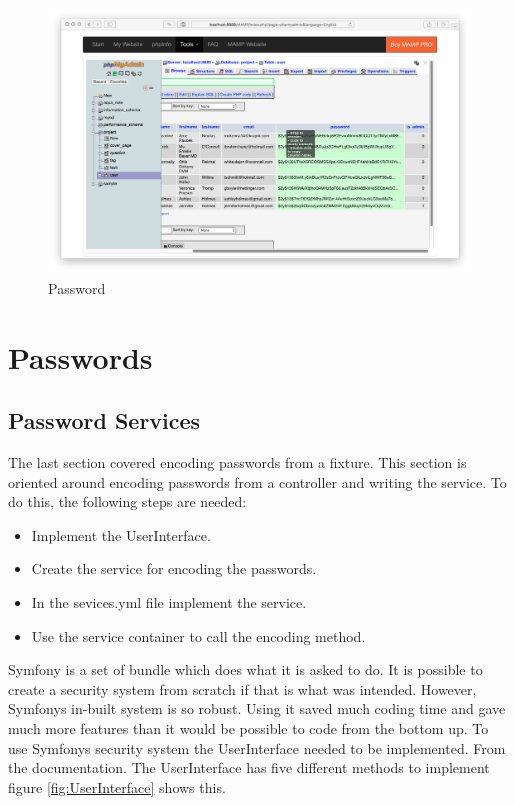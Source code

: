 \begin{figure}[htbp]
   \centering
   \includegraphics[width=400pt]{figures/password.png} %
   \caption{Password}
   \label{fig:Password}
\end{figure}

\section{Passwords}

\subsection{Password Services}

The last section covered encoding passwords from a fixture. This section is oriented around encoding passwords from a controller and writing the service. To do this, the following steps are needed:

\begin{itemize}
  \item Implement the UserInterface.
    \item Create the service for encoding the passwords.
      \item In the sevices.yml file implement the service.
        \item Use the service container to call the encoding method.
\end{itemize}

Symfony is a set of bundle which does what it is asked to do. It is possible to create a security system from scratch if that is what was intended. However, Symfonys in-built system is so robust. Using it saved much coding time and gave much more features than it would be possible to code from the bottom up. To use Symfonys security system the UserInterface needed to be implemented. From the documentation. The UserInterface has five different methods to implement figure \ref{fig:UserInterface} shows this.

